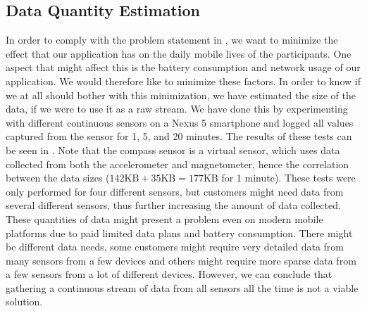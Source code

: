 
\subsection{Data Quantity Estimation}
\label{sec:data_quantity_estimation}


In order to comply with the problem statement in , we want to minimize the effect that our application has on the daily mobile lives of the participants. One aspect that might affect this is the battery consumption and network usage of our application. We would therefore like to minimize these factors. In order to know if we at all should bother with this minimization, we have estimated the size of the data, if we were to use it as a raw stream. We have done this by experimenting with different continuous sensors on a Nexus 5 smartphone and logged all values captured from the sensor for 1, 5, and 20 minutes. The results of these tests can be seen in . Note that the compass sensor is a virtual sensor, which uses data collected from both the accelerometer and magnetometer, hence the correlation between the data sizes ($142 \text{KB} + 35 \text{KB} = 177 \text{KB}$ for 1 minute). These tests were only performed for four different sensors, but customers might need data from several different sensors, thus further increasing the amount of data collected. These quantities of data might present a problem even on modern mobile platforms due to paid limited data plans and battery consumption. There might be different data needs, some customers might require very detailed data from many sensors from a few devices and others might require more sparse data from a few sensors from a lot of different devices. However, we can conclude that gathering a continuous stream of data from all sensors all the time is not a viable solution.

